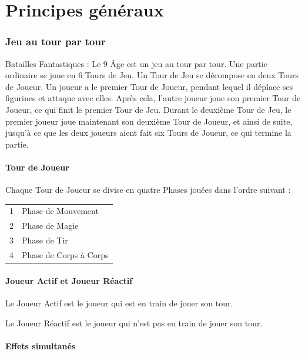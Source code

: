 
\part{Principes généraux}

\section{Jeu au tour par tour}

Batailles Fantastiques : Le 9\ieme{} Âge est un jeu au tour par tour. Une partie ordinaire se joue en 6 Tours de Jeu. Un Tour de Jeu se décompose en deux Tours de Joueur. Un joueur a le premier Tour de Joueur, pendant lequel il déplace ses figurines et attaque avec elles. Après cela, l'autre joueur joue son premier Tour de Joueur, ce qui finit le premier Tour de Jeu. Durant le deuxième Tour de Jeu, le premier joueur joue maintenant son deuxième Tour de Joueur, et ainsi de suite, jusqu'à ce que les deux joueurs aient fait six Tours de Joueur, ce qui termine la partie.

\subsection{Tour de Joueur}

Chaque Tour de Joueur se divise en quatre Phases jouées dans l'ordre suivant :

\hspace*{0.3cm}
\begin{tabular}{c|l}
1 & Phase de Mouvement \tabularnewline
2 & Phase de Magie \tabularnewline
3 & Phase de Tir \tabularnewline
4 & Phase de Corps à Corps \tabularnewline
\end{tabular}

\subsection{Joueur Actif et Joueur Réactif}

Le Joueur Actif est le joueur qui est en train de jouer son tour.

Le Joueur Réactif est le joueur qui n'est pas en train de jouer son tour.

\subsection{Effets simultanés}

